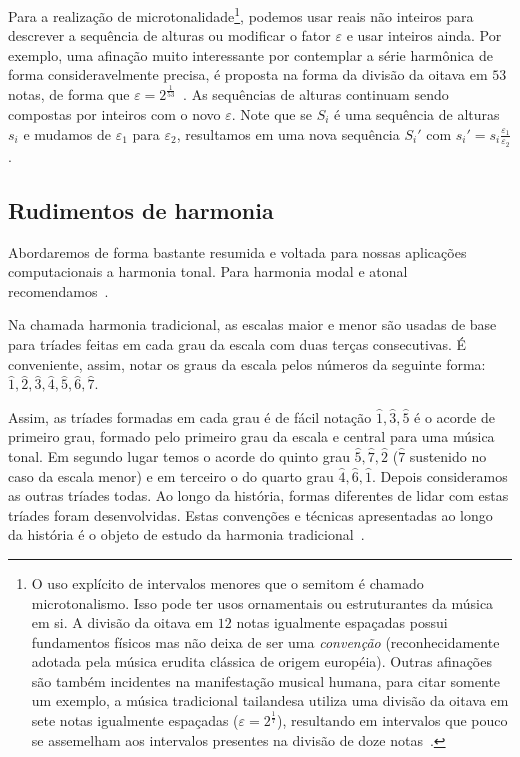 Para a realização de microtonalidade\footnote{O uso explícito de
intervalos menores que o semitom é chamado microtonalismo. Isso pode ter usos
ornamentais ou estruturantes da música em si. A
divisão da oitava em $12$ notas igualmente espaçadas possui fundamentos físicos mas
não deixa de ser uma \emph{convenção}
(reconhecidamente adotada pela música erudita clássica de origem européia). Outras afinações
são também incidentes na manifestação musical humana, para citar somente um exemplo, a
música tradicional tailandesa utiliza uma divisão da oitava em sete notas igualmente
espaçadas ($\varepsilon=2^{\frac{1}{7}}$),
resultando em intervalos que pouco se assemelham aos intervalos presentes na
divisão de doze notas~\cite{Wisnick}.},
podemos usar reais não inteiros
para descrever a sequência de alturas ou modificar o fator $\varepsilon$
e usar inteiros ainda. Por exemplo, uma afinação muito
interessante por contemplar a série harmônica de forma consideravelmente precisa,
é proposta na forma da divisão da oitava em $53$ notas, de forma
que $\varepsilon=2^{\frac{1}{53}}$~\cite{microtonalidade}. As sequências de alturas
continuam sendo compostas por inteiros com o novo $\varepsilon$.
Note que se $S_i$ é uma sequência de alturas $s_i$ e mudamos de $\varepsilon_1$ para
$\varepsilon_2$,
resultamos em uma nova sequência $S_i'$ com $s_i'=s_i \frac{\varepsilon_1}{\varepsilon_2}$.


\subsection{Rudimentos de harmonia}

Abordaremos de forma bastante resumida e voltada para nossas aplicações
computacionais a harmonia tonal. Para harmonia modal e atonal recomendamos~\cite{harmEXT}.

Na chamada harmonia tradicional, as escalas maior e menor são usadas
de base para tríades feitas em cada grau da escala com duas terças consecutivas.
É conveniente, assim, notar os graus da escala pelos números da seguinte forma: $\hat{1},\hat{2},\hat{3},\hat{4},\hat{5},\hat{6},\hat{7}$.

Assim, as tríades formadas em cada grau é de fácil notação $\hat{1},\hat{3},\hat{5}$ é o acorde de primeiro grau, formado pelo primeiro grau da escala e central para uma música tonal. Em segundo lugar temos o acorde do quinto grau $\hat{5},\hat{7},\hat{2}$ ($\hat{7}$ sustenido no caso da escala menor) e em terceiro o do quarto grau $\hat{4},\hat{6},\hat{1}$. Depois consideramos as outras tríades todas. Ao longo da história, formas diferentes de lidar com estas tríades foram desenvolvidas. Estas convenções e técnicas apresentadas ao longo da história é o objeto de estudo da harmonia tradicional~\cite{Harmonia}.

